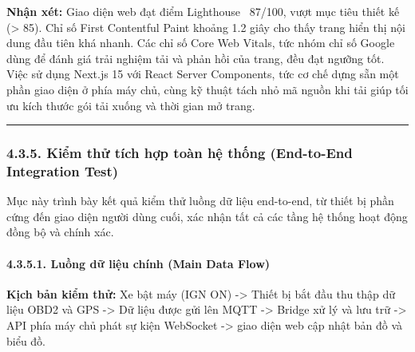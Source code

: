 \documentclass[a4paper]{extarticle}
\begin{document}
\textbf{Nhận xét:} Giao diện web đạt điểm Lighthouse ~87/100, vượt mục
tiêu thiết kế (\textgreater{} 85). Chỉ số First Contentful Paint khoảng
1.2 giây cho thấy trang hiển thị nội dung đầu tiên khá nhanh. Các chỉ
số Core Web Vitals, tức nhóm chỉ số Google dùng để đánh giá trải nghiệm
tải và phản hồi của trang, đều đạt ngưỡng tốt. Việc sử dụng Next.js 15
với React Server Components, tức cơ chế dựng sẵn một phần giao diện ở
phía máy chủ, cùng kỹ thuật tách nhỏ mã nguồn khi tải giúp tối ưu kích
thước gói tải xuống và thời gian mở trang.

\begin{center}\rule{0.5\linewidth}{0.5pt}\end{center}

\subsubsection{4.3.5. Kiểm thử tích hợp toàn hệ thống (End-to-End
Integration
Test)}\label{435-kiux1ec3m-thux1eed-tuxedch-hux1ee3p-touxe0n-hux1ec7-thux1ed1ng-end-to-end-integration-test}

Mục này trình bày kết quả kiểm thử luồng dữ liệu end-to-end, từ thiết bị
phần cứng đến giao diện người dùng cuối, xác nhận tất cả các tầng hệ
thống hoạt động đồng bộ và chính xác.

\paragraph{4.3.5.1. Luồng dữ liệu chính (Main Data
Flow)}\label{4351-luux1ed3ng-dux1eef-liux1ec7u-chuxednh-main-data-flow}

\textbf{Kịch bản kiểm thử:} Xe bật máy (IGN ON) -\textgreater{} Thiết bị
bắt đầu thu thập dữ liệu OBD2 và GPS -\textgreater{} Dữ liệu được
gửi lên MQTT -\textgreater{} Bridge xử lý và lưu trữ -\textgreater{}
API phía máy chủ phát sự kiện WebSocket -\textgreater{} giao diện web cập nhật bản đồ
và biểu đồ.
\end{document}
